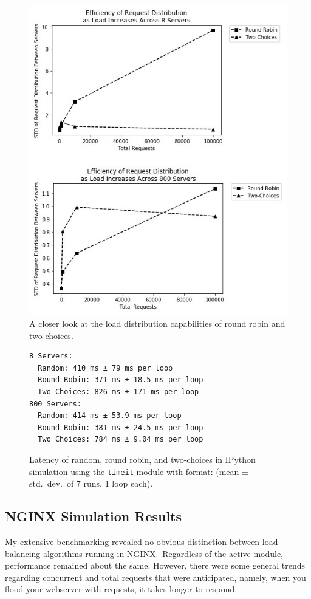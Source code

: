 \begin{figure}
  \includegraphics[width=\linewidth]{figures/py/all2.jpg}
  \caption{A closer look at the load distribution capabilities of round robin and two-choices.}
\label{fig:python2}
\end{figure}

\begin{figure}
\begin{verbatim}
8 Servers:
  Random: 410 ms ± 79 ms per loop
  Round Robin: 371 ms ± 18.5 ms per loop
  Two Choices: 826 ms ± 171 ms per loop
800 Servers:
  Random: 414 ms ± 53.9 ms per loop
  Round Robin: 381 ms ± 24.5 ms per loop
  Two Choices: 784 ms ± 9.04 ms per loop
\end{verbatim}
\caption{Latency of random, round robin, and two-choices in IPython
  simulation using the \texttt{timeit} module with 
  format: (mean ± std.\ dev.\ of 7 runs, 1 loop each).}
\label{fig:python3}
\end{figure}

\newpage\null\newpage
\subsection{NGINX Simulation Results}
My extensive benchmarking revealed no obvious distinction between load
balancing algorithms running in NGINX.\ Regardless of the active
module, performance remained about the same. However, there were some
general trends regarding concurrent and total requests that were
anticipated, namely, when you flood your webserver with requests, it
takes longer to respond.

